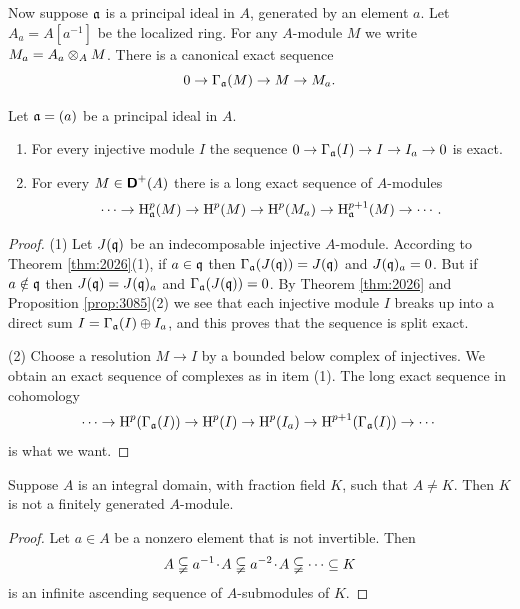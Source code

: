 Now suppose $\mathfrak{a}$ is a principal ideal in $A$, generated by an 
element $a$. Let $A_a  = A[a^{-1}]$ be the localized ring.
For any $A$-module $M$ we write $M_a = A_a \otimes_A M$. 
There is a canonical exact sequence 
\begin{equation} \label{eqn:2206}
0 \to \Gamma_{\mathfrak{a}}(M) \to M \to M_a . 
\end{equation}

\begin{lem} \label{lem:2220}
Let $\mathfrak{a} = (a)$ be a principal ideal in $A$. 
\begin{enumerate}
\item For every injective module $I$ the sequence 
$0 \to \Gamma_{\mathfrak{a}}(I) \to I \to I_a \to 0$
is exact. 

\item For every $M \in \boldsymbol{\mathsf{D}}^+(A)$ there is a long exact sequence of 
$A$-modules 
\[ \cdots \to \operatorname{H}^p_{\mathfrak{a}}(M) \to \operatorname{H}^p(M) \to \operatorname{H}^p(M_a) \to 
\operatorname{H}^{p + 1}_{\mathfrak{a}}(M) \to  \cdots . \]
\end{enumerate}
\end{lem}

\begin{proof}
(1) Let $J(\mathfrak{q})$ be an indecomposable injective $A$-module. According to Theorem 
\ref{thm:2026}(1), if $a \in \mathfrak{q}$ then 
$\Gamma_{\mathfrak{a}}(J(\mathfrak{q})) = J(\mathfrak{q})$ and $J(\mathfrak{q})_a = 0$. But if $a \notin \mathfrak{q}$
then $J(\mathfrak{q}) = J(\mathfrak{q})_a$ and $\Gamma_{\mathfrak{a}}(J(\mathfrak{q})) = 0$.
By Theorem \ref{thm:2026} and Proposition \ref{prop:3085}(2)
we see that each injective module $I$ breaks up into 
a direct sum $I = \Gamma_{\mathfrak{a}}(I) \oplus I_a$, and this proves that the sequence 
is split exact.  

\medskip \noindent
(2) Choose a resolution $M \to I$ by a bounded below complex of injectives. 
We obtain an exact sequence of complexes as in item (1). The long 
exact sequence in cohomology
\[ \cdots \to \operatorname{H}^p(\Gamma_{\mathfrak{a}}(I)) \to \operatorname{H}^p(I) \to 
\operatorname{H}^p(I_a) \to \operatorname{H}^{p + 1}(\Gamma_{\mathfrak{a}}(I)) \to  \cdots  \]
is what we want. 
\end{proof}

\begin{lem} \label{lem:2235}
Suppose $A$ is an integral domain, with fraction field $K$, such that
$A \neq K$. Then $K$ is not a finitely generated $A$-module. 
\end{lem}

\begin{proof}
Let $a \in A$ be a nonzero element that is not invertible. Then 
\[ A \subsetneqq a^{-1} \mspace{1.5mu}{\cdot}\mspace{1.5mu} A \subsetneqq a^{-2} \mspace{1.5mu}{\cdot}\mspace{1.5mu} A \subsetneqq
\cdots \subseteq K \]
is an infinite ascending sequence of $A$-submodules of $K$. 
\end{proof}

